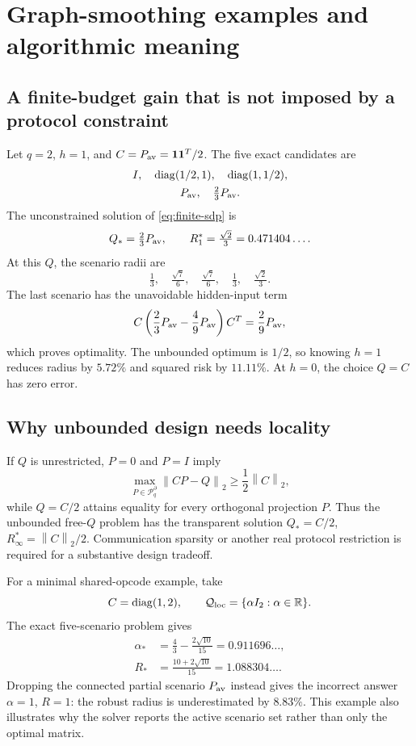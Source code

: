 \documentclass[journal,10pt]{IEEEtran}
\theoremstyle{definition}
\theoremstyle{remark}
\newcommand{\R}{\mathbb R}
\newcommand{\one}{\mathbf 1}
\newcommand{\diag}{\operatorname{diag}}
\newcommand{\cP}{\mathcal P}
\newcommand{\cQ}{\mathcal Q}
\newcommand{\norm}[1]{\left\lVert #1\right\rVert}
\begin{document}
\section{Graph-smoothing examples and algorithmic meaning}

\subsection{A finite-budget gain that is not imposed by a protocol constraint}

Let $q=2$, $h=1$, and
$C=P_{\rm av}=\one\one^T/2$.  The five exact candidates are
\[
 \begin{gathered}
 I,\quad \diag(1/2,1),\quad \diag(1,1/2),\\
 P_{\rm av},\quad \tfrac23P_{\rm av}.
 \end{gathered}
\]
The unconstrained solution of \eqref{eq:finite-sdp} is
\begin{equation}
 Q_*=\tfrac23P_{\rm av},\qquad
 R_1^*=\tfrac{\sqrt2}{3}=0.471404\ldots .
 \label{eq:finite-example}
\end{equation}
At this $Q$, the scenario radii are
\[
 \tfrac13,\quad\tfrac{\sqrt7}{6},\quad\tfrac{\sqrt7}{6},
 \quad\tfrac13,\quad\tfrac{\sqrt2}{3}.
\]
The last scenario has the unavoidable hidden-input term
\[
 C\left(\frac23P_{\rm av}-\frac49P_{\rm av}\right)C^T
 =\frac29P_{\rm av},
\]
which proves optimality.  The unbounded optimum is $1/2$, so knowing $h=1$
reduces radius by $5.72\%$ and squared risk by $11.11\%$.  At $h=0$, the
choice $Q=C$ has zero error.

\subsection{Why unbounded design needs locality}

If $Q$ is unrestricted, $P=0$ and $P=I$ imply
\[
 \max_{P\in\cP_q^\partial}\norm{CP-Q}_2\geq\frac12\norm C_2,
\]
while $Q=C/2$ attains equality for every orthogonal projection $P$.  Thus the
unbounded free-$Q$ problem has the transparent solution
$Q_*=C/2$, $R_\infty^*=\norm C_2/2$.  Communication sparsity or another real
protocol restriction is required for a substantive design tradeoff.

For a minimal shared-opcode example, take
\[
 C=\diag(1,2),\qquad \cQ_{\rm loc}=\{\alpha I_2:\alpha\in\R\}.
\]
The exact five-scenario problem gives
\begin{equation}
\begin{aligned}
 \alpha_*&=\tfrac43-\tfrac{2\sqrt{10}}{15}
             =0.911696\ldots,\\
 R_*&=\tfrac{10+2\sqrt{10}}{15}
             =1.088304\ldots .
\end{aligned}
 \label{eq:shared-example}
\end{equation}
Dropping the connected partial scenario $P_{\rm av}$ instead gives the
incorrect answer $\alpha=1$, $R=1$: the robust radius is underestimated by
$8.83\%$.  This example also illustrates why the solver reports the active
scenario set rather than only the optimal matrix.
\end{document}
